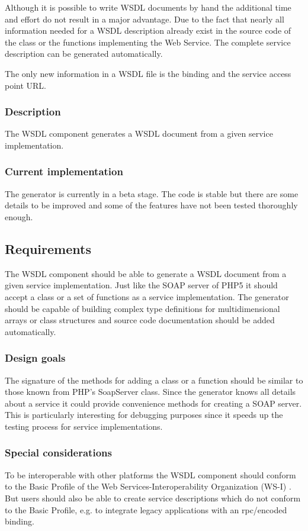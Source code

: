 \documentclass[10pt,final,a4paper,oneside]{article}
\begin{document}
Although it is possible
to write WSDL documents by hand
the additional time and effort
do not result in a major advantage.
Due to the fact that nearly all information
needed for a WSDL description already exist
in the source code of the class or the functions
implementing the Web Service.
The complete service description
can be generated automatically.

The only new information in a WSDL file
is the binding and the service access point URL.

\subsubsection{Description}
The WSDL component generates a WSDL document
from a given service implementation.

\subsubsection{Current implementation}
The generator is currently in a beta stage.
The code is stable but there are some details to be improved
and some of the features have not been tested thoroughly enough.

\subsection{Requirements}\label{subsec:WSDLRequirements}
The WSDL component should be able to generate a WSDL document
from a given service implementation.
Just like the SOAP server of PHP5 it should accept
a class or a set of functions as a service implementation.
The generator should be capable of building complex type definitions
for multidimensional arrays or class structures and source code documentation should be added
automatically.

\subsubsection{Design goals}

The signature of the methods for adding a class or a function should
be similar to those known from PHP's SoapServer class.
Since the generator knows all details about a service
it could provide convenience methods for creating a SOAP server.
This is particularly interesting for debugging purposes
since it speeds up the testing process for service implementations.

\subsubsection{Special considerations}
To be interoperable with other platforms
the WSDL component should conform
to the Basic Profile of the
Web Services-Interoperability Organization (WS-I) \cite{BasicProfile}.
But users should also be able to create service descriptions
which do not conform to the Basic Profile,
e.g. to integrate legacy applications
with an rpc/encoded binding.
\end{document}
